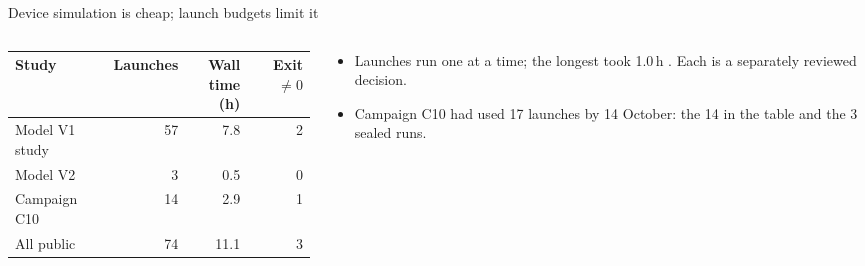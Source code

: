 \begin{frame}[t]{Device simulation is cheap; launch budgets limit it}
  \thirteenTop\thirteendense
  \begin{columns}[T,onlytextwidth]
    \begin{column}{0.58\textwidth}
      {\footnotesize\setlength{\tabcolsep}{4.5pt}
      \begin{tabular}{@{}lrrr@{}}
        \toprule
        Study & Launches & \shortstack[r]{Wall\\time (h)} & \shortstack[r]{Exit\\$\neq 0$} \\
        \midrule
        Model V1 study      & 57 & 7.8 & 2 \\
        Model V2            &  3 & 0.5 & 0 \\
        Campaign C10        & 14 & 2.9 & 1 \\
        \midrule
        All public          & 74 & 11.1 & 3 \\
        \bottomrule
      \end{tabular}\par}
    \end{column}
    \begin{column}{0.39\textwidth}
      \vspace{4.2mm}
      \begin{itemize}
        \item Launches run one at a time; the longest took 1.0\,h . Each is a separately reviewed
          decision.
        \item Campaign C10 had used 17 launches by 14 October: the 14 in the table and the 3 sealed runs.
      \end{itemize}
    \end{column}
  \end{columns}
\end{frame}
